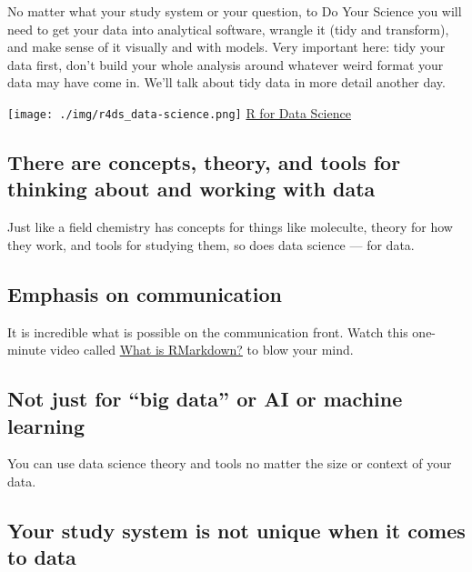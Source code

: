 \documentclass[
  letterpaper,
  DIV=11,
  numbers=noendperiod]{scrreprt}
\begin{document}
No matter what your study system or your question, to Do Your Science
you will need to get your data into analytical software, wrangle it
(tidy and transform), and make sense of it visually and with models.
Very important here: tidy your data first, don't build your whole
analysis around whatever weird format your data may have come in. We'll
talk about tidy data in more detail another day.

\texttt{[image: ./img/r4ds\_data-science.png]} \href{}{R for Data
Science}

\hypertarget{there-are-concepts-theory-and-tools-for-thinking-about-and-working-with-data}{%
\subsection{There are concepts, theory, and tools for thinking about and
working with
data}\label{there-are-concepts-theory-and-tools-for-thinking-about-and-working-with-data}}

Just like a field chemistry has concepts for things like moleculte,
theory for how they work, and tools for studying them, so does data
science --- for data.

\hypertarget{emphasis-on-communication}{%
\subsection{Emphasis on communication}\label{emphasis-on-communication}}

It is incredible what is possible on the communication front. Watch this
one-minute video called \href{https://vimeo.com/178485416}{What is
RMarkdown?} to blow your mind.

\hypertarget{not-just-for-big-data-or-ai-or-machine-learning}{%
\subsection{Not just for ``big data'' or AI or machine
learning}\label{not-just-for-big-data-or-ai-or-machine-learning}}

You can use data science theory and tools no matter the size or context
of your data.

\hypertarget{your-study-system-is-not-unique-when-it-comes-to-data}{%
\subsection{Your study system is not unique when it comes to
data}\label{your-study-system-is-not-unique-when-it-comes-to-data}}
\end{document}
